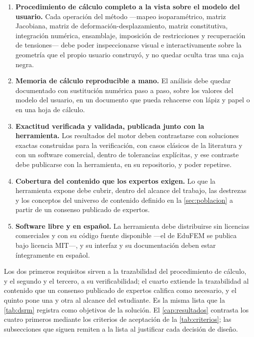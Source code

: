 \begin{enumerate}
    \item \textbf{Procedimiento de cálculo completo a la vista sobre el modelo del usuario.} Cada operación del método —mapeo isoparamétrico, matriz Jacobiana, matriz de deformación-desplazamiento, matriz constitutiva, integración numérica, ensamblaje, imposición de restricciones y recuperación de tensiones— debe poder inspeccionarse visual e interactivamente sobre la geometría que el propio usuario construyó, y no quedar oculta tras una caja negra.
    \item \textbf{Memoria de cálculo reproducible a mano.} El análisis debe quedar documentado con sustitución numérica paso a paso, sobre los valores del modelo del usuario, en un documento que pueda rehacerse con lápiz y papel o en una hoja de cálculo.
    \item \textbf{Exactitud verificada y validada, publicada junto con la herramienta.} Los resultados del motor deben contrastarse con soluciones exactas construidas para la verificación, con casos clásicos de la literatura y con un software comercial, dentro de tolerancias explícitas, y ese contraste debe publicarse con la herramienta, en su repositorio, y poder repetirse.
    \item \textbf{Cobertura del contenido que los expertos exigen.} Lo que la herramienta expone debe cubrir, dentro del alcance del trabajo, las destrezas y los conceptos del universo de contenido definido en la \autoref{sec:poblacion} a partir de un consenso publicado de expertos.
    \item \textbf{Software libre y en español.} La herramienta debe distribuirse sin licencias comerciales y con su código fuente disponible ---el de EduFEM se publica bajo licencia MIT---, y su interfaz y su documentación deben estar íntegramente en español.
\end{enumerate}

Los dos primeros requisitos sirven a la trazabilidad del procedimiento de cálculo, y el segundo y el tercero, a su verificabilidad; el cuarto extiende la trazabilidad al contenido que un consenso publicado de expertos califica como necesario, y el quinto pone una y otra al alcance del estudiante. Es la misma lista que la \autoref{tab:dsrm} registra como objetivos de la solución. El \autoref{cap:resultados} contrasta los cuatro primeros mediante los criterios de aceptación de la \autoref{tab:criterios}; las subsecciones que siguen remiten a la lista al justificar cada decisión de diseño.


